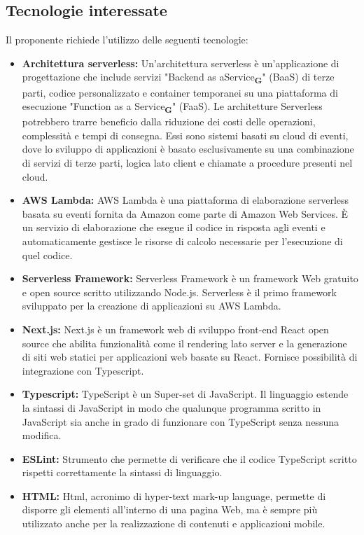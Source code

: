 \subsection{Tecnologie interessate}
Il proponente richiede l’utilizzo delle seguenti tecnologie:
\begin{itemize}
    \item \textbf{Architettura serverless:} Un'architettura serverless è un’applicazione di progettazione che include servizi "Backend as aService\textsubscript{\textbf{G}}" (BaaS) di terze parti, codice personalizzato e container temporanei su una piattaforma di esecuzione "Function as a Service\textsubscript{\textbf{G}}" (FaaS). Le architetture Serverless potrebbero trarre beneficio dalla riduzione dei costi delle operazioni, complessità e tempi di consegna. Essi sono sistemi basati su cloud di eventi, dove lo sviluppo di applicazioni è basato esclusivamente su una combinazione di servizi di terze parti, logica lato client e chiamate a procedure presenti nel cloud.
    \item \textbf{AWS Lambda:} AWS Lambda è una piattaforma di elaborazione serverless basata su eventi fornita da Amazon come parte di Amazon Web Services. È un servizio di elaborazione che esegue il codice in risposta agli eventi e automaticamente gestisce le risorse di calcolo necessarie per l'esecuzione di quel codice.
    \item \textbf{Serverless Framework:} Serverless Framework è un framework Web gratuito e open source scritto utilizzando Node.js. Serverless è il primo framework sviluppato per la creazione di applicazioni su AWS Lambda.
    \item \textbf{Next.js:} Next.js è un framework web di sviluppo front-end React open source che abilita funzionalità come il rendering lato server e la generazione di siti web statici per applicazioni web basate su React. Fornisce possibilità di integrazione con Typescript.
    \item \textbf{Typescript:} TypeScript è un Super-set di JavaScript. Il linguaggio estende la sintassi di JavaScript in modo che qualunque programma scritto in JavaScript sia anche in grado di funzionare con TypeScript senza nessuna modifica.
    \item \textbf{ESLint:} Strumento che permette di verificare che il codice TypeScript scritto rispetti correttamente la sintassi di linguaggio.
    \item \textbf{HTML:} Html, acronimo di hyper-text mark-up language, permette di disporre gli elementi all’interno di una pagina Web, ma è sempre più utilizzato anche per la realizzazione di contenuti e applicazioni mobile.

\end{itemize}
